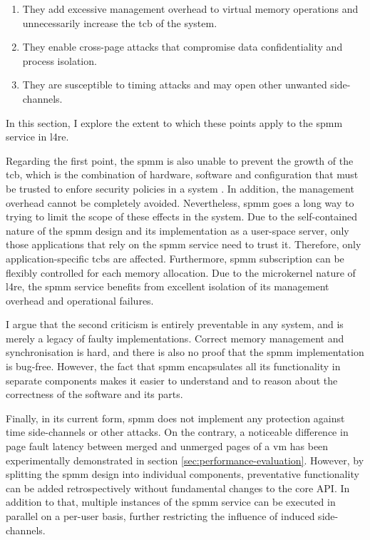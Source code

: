 \begin{enumerate}
  \item They add excessive management overhead to virtual memory operations and unnecessarily increase the \ac{tcb} of the system.
  \item They enable cross-page attacks that compromise data confidentiality and process isolation.
  \item They are susceptible to timing attacks and may open other unwanted side-channels.
\end{enumerate}

In this section, I explore the extent to which these points apply to the \ac{spmm} service in \ac{l4re}.

Regarding the first point, the \ac{spmm} is also unable to prevent the growth of the \ac{tcb}, which is the combination of hardware, software and configuration that must be trusted to enfore security policies in a system \cite{tcsec1986}.
In addition, the management overhead cannot be completely avoided.
Nevertheless, \ac{spmm} goes a long way to trying to limit the scope of these effects in the system.
Due to the self-contained nature of the \ac{spmm} design and its implementation as a user-space server, only those applications that rely on the \ac{spmm} service need to trust it.
Therefore, only application-specific \acp{tcb} are affected.
Furthermore, \ac{spmm} subscription can be flexibly controlled for each memory allocation.
Due to the microkernel nature of \ac{l4re}, the \ac{spmm} service benefits from excellent isolation of its management overhead and operational failures.

I argue that the second criticism is entirely preventable in any system, and is merely a legacy of faulty implementations.
Correct memory management and synchronisation is hard, and there is also no proof that the \ac{spmm} implementation is bug-free.
However, the fact that \ac{spmm} encapsulates all its functionality in separate components makes it easier to understand and to reason about the correctness of the software and its parts.

Finally, in its current form, \ac{spmm} does not implement any protection against time side-channels or other attacks.
On the contrary, a noticeable difference in page fault latency between merged and unmerged pages of a \ac{vm} has been experimentally demonstrated in section \ref{sec:performance-evaluation}.
However, by splitting the \ac{spmm} design into individual components, preventative functionality can be added retrospectively without fundamental changes to the core API.
In addition to that, multiple instances of the \ac{spmm} service can be executed in parallel on a per-user basis, further restricting the influence of induced side-channels.
